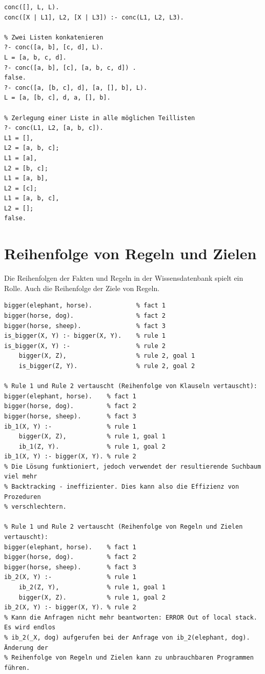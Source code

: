 \begin{lstlisting}[caption=Listenkonkatenation]
conc([], L, L).
conc([X | L1], L2, [X | L3]) :- conc(L1, L2, L3).

% Zwei Listen konkatenieren
?- conc([a, b], [c, d], L).
L = [a, b, c, d].
?- conc([a, b], [c], [a, b, c, d]) .
false.
?- conc([a, [b, c], d], [a, [], b], L).
L = [a, [b, c], d, a, [], b].

% Zerlegung einer Liste in alle möglichen Teillisten
?- conc(L1, L2, [a, b, c]).
L1 = [],
L2 = [a, b, c];
L1 = [a],
L2 = [b, c];
L1 = [a, b],
L2 = [c];
L1 = [a, b, c],
L2 = [];
false.
\end{lstlisting}

\newpage

\section{Reihenfolge von Regeln und Zielen}
Die Reihenfolgen der Fakten und Regeln in der Wissensdatenbank spielt ein Rolle. Auch die Reihenfolge der Ziele von Regeln.

\begin{lstlisting}[caption=Reihenfolgen von Regeln und Zielen]
% Bekanntes is_bigger/2 Prädikat:
bigger(elephant, horse). 			% fact 1
bigger(horse, dog). 				% fact 2
bigger(horse, sheep). 				% fact 3
is_bigger(X, Y) :- bigger(X, Y). 	% rule 1
is_bigger(X, Y) :- 					% rule 2
	bigger(X, Z), 					% rule 2, goal 1
	is_bigger(Z, Y). 				% rule 2, goal 2

% Rule 1 und Rule 2 vertauscht (Reihenfolge von Klauseln vertauscht):
bigger(elephant, horse). 	% fact 1
bigger(horse, dog). 		% fact 2
bigger(horse, sheep). 		% fact 3
ib_1(X, Y) :- 				% rule 1
	bigger(X, Z), 			% rule 1, goal 1
	ib_1(Z, Y). 			% rule 1, goal 2
ib_1(X, Y) :- bigger(X, Y). % rule 2
% Die Lösung funktioniert, jedoch verwendet der resultierende Suchbaum viel mehr
% Backtracking - ineffizienter. Dies kann also die Effizienz von Prozeduren
% verschlechtern.

% Rule 1 und Rule 2 vertauscht (Reihenfolge von Regeln und Zielen vertauscht):
bigger(elephant, horse). 	% fact 1
bigger(horse, dog). 		% fact 2
bigger(horse, sheep). 		% fact 3
ib_2(X, Y) :- 				% rule 1
	ib_2(Z, Y), 			% rule 1, goal 1
	bigger(X, Z). 			% rule 1, goal 2
ib_2(X, Y) :- bigger(X, Y). % rule 2
% Kann die Anfragen nicht mehr beantworten: ERROR Out of local stack. Es wird endlos
% ib_2(_X, dog) aufgerufen bei der Anfrage von ib_2(elephant, dog). Änderung der
% Reihenfolge von Regeln und Zielen kann zu unbrauchbaren Programmen führen.
\end{lstlisting}

